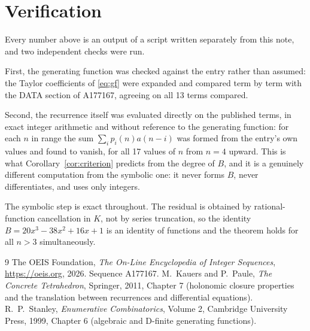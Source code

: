 \documentclass[11pt,a4paper]{article}
\theoremstyle{plain}
\theoremstyle{definition}
\begin{document}
\section{Verification}

Every number above is an output of a script written separately from this note, and two
independent checks were run.

First, the generating function was checked against the entry rather than assumed: the
Taylor coefficients of \eqref{eq:gf} were expanded and compared term by term with the DATA
section of A177167, agreeing on all 13 terms compared.

Second, the recurrence itself was evaluated directly on the published terms, in exact
integer arithmetic and without reference to the generating function: for each $n$ in range
the sum $\sum_{i}p_{i}(n)a(n-i)$ was formed from the entry's own values and found to
vanish, for all 17 values of $n$ from $n=4$ upward. This is what
Corollary~\ref{cor:criterion} predicts from the degree of $B$, and it is a genuinely
different computation from the symbolic one: it never forms $B$, never differentiates, and
uses only integers.

The symbolic step is exact throughout. The residual is obtained by rational-function
cancellation in $K$, not by series truncation, so the identity $B=20 x^{3} - 38 x^{2} + 16 x + 1$ is an
identity of functions and the theorem holds for all $n>3$ simultaneously.

\begin{thebibliography}{9}
 The OEIS Foundation, \emph{The On-Line Encyclopedia of Integer Sequences},
\url{https://oeis.org}, 2026. Sequence A177167.
 M.~Kauers and P.~Paule, \emph{The Concrete Tetrahedron}, Springer, 2011,
Chapter 7 (holonomic closure properties and the translation between recurrences and
differential equations).
 R.~P.~Stanley, \emph{Enumerative Combinatorics}, Volume 2, Cambridge
University Press, 1999, Chapter 6 (algebraic and D-finite generating functions).
\end{thebibliography}
\end{document}
